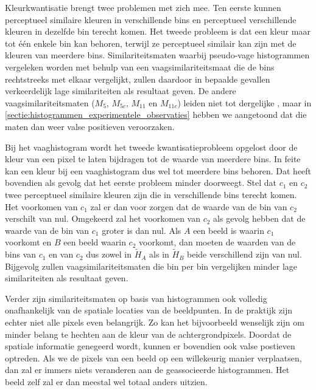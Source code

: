 Kleurkwantisatie brengt twee problemen met zich mee. Ten eerste kunnen 
perceptueel similaire kleuren in verschillende bins en perceptueel 
verschillende kleuren in dezelfde bin terecht komen. Het tweede probleem is dat 
een kleur maar tot \'e\'en enkele bin kan behoren, terwijl ze perceptueel 
similair kan zijn met de kleuren van meerdere bins. Similariteitsmaten waarbij 
pseudo-vage histogrammen vergeleken worden met behulp van een 
vaagsimilariteitsmaat die de bins rechtstreeks met elkaar vergelijkt, zullen 
daardoor in bepaalde gevallen verkeerdelijk lage similariteiten als resultaat 
geven. De andere vaagsimilariteitsmaten ($M_5$, $M_{5c}$, $M_{11}$ en 
$M_{11c}$) leiden niet tot dergelijke , maar in 
\ref{sectie:histogrammen_experimentele_observaties} hebben we aangetoond dat 
die maten dan weer valse positieven veroorzaken.

Bij het vaaghistogram wordt het tweede kwantisatieprobleem opgelost
door de kleur van een pixel te laten bijdragen tot de waarde van meerdere bins. In feite kan een kleur
bij een vaaghistogram dus wel tot meerdere bins behoren. Dat heeft
bovendien als gevolg dat het eerste probleem minder doorweegt. Stel dat $c_1$ en $c_2$ twee perceptueel
similaire kleuren zijn die in verschillende bins terecht komen. Het
voorkomen van $c_1$ zal er dan voor zorgen dat de waarde van de bin van $c_2$ verschilt van nul.
Omgekeerd zal het voorkomen van $c_2$ als gevolg hebben dat de waarde van de bin van $c_1$ groter is
dan nul. Als $A$ een beeld is waarin $c_1$ voorkomt en $B$ een beeld waarin $c_2$ voorkomt, dan
moeten de waarden van de bins van $c_1$ en van $c_2$ dus zowel in $\widetilde{H}_A$ als in 
$\widetilde{H}_B$ beide verschillend zijn van nul. Bijgevolg zullen vaagsimilariteitsmaten
die bin per bin vergelijken minder lage similariteiten als resultaat geven.

Verder zijn similariteitsmaten op basis van histogrammen ook volledig onafhankelijk van de 
spatiale locaties van de beeldpunten. In
de praktijk zijn echter niet alle pixels even belangrijk. Zo kan het
bijvoorbeeld wenselijk zijn om minder belang te hechten aan de kleur van
de achtergrondpixels. Doordat de spatiale informatie genegeerd wordt,
kunnen er bovendien ook valse postieven optreden. Als we de pixels van een
beeld op een willekeurig manier verplaatsen, dan zal er immers niets veranderen aan
de geassocieerde histogrammen. Het beeld zelf zal er dan meestal wel totaal anders uitzien.  

